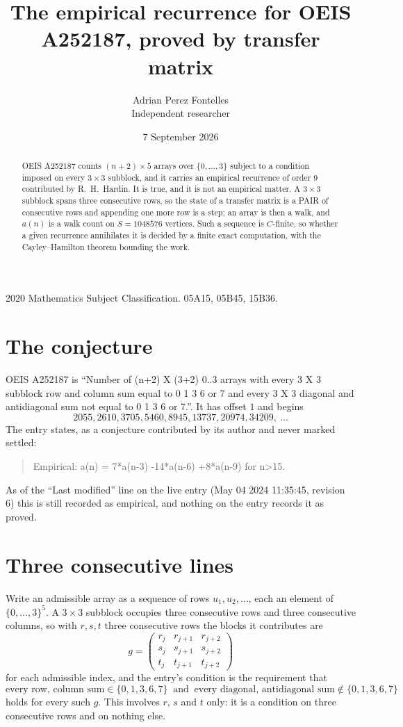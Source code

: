 \documentclass[11pt,a4paper]{article}
\title{The empirical recurrence for OEIS A252187, proved by transfer matrix}
\author{Adrian Perez Fontelles\\ \small Independent researcher}
\date{7 September 2026}
\theoremstyle{plain}
\theoremstyle{definition}
\begin{document}
\maketitle

\begin{abstract}
OEIS A252187 counts $(n+2)\times5$ arrays over $\{0,\dots,3\}$ subject to a condition imposed on
every $3\times3$ subblock, and it carries an empirical recurrence of order $9$
contributed by R.~H.~Hardin. It is true, and it is not an empirical matter. A $3\times3$
subblock spans three consecutive rows, so the state of a transfer matrix is a PAIR of
consecutive rows and appending one more row is a step; an array is then a walk, and
$a(n)$ is a walk count on $S=1048576$ vertices. Such a sequence is $C$-finite, so whether a given
recurrence annihilates it is decided by a finite exact computation, with the Cayley--Hamilton
theorem bounding the work.
\end{abstract}

\noindent\small 2020 Mathematics Subject Classification. 05A15, 05B45, 15B36.\normalsize

\section{The conjecture}

OEIS A252187 is ``Number of (n+2) X (3+2) 0..3 arrays with every 3 X 3 subblock row and column sum equal to 0 1 3 6 or 7 and every 3 X 3 diagonal and antidiagonal sum not equal to 0 1 3 6 or 7.''. It has offset $1$ and begins
\[
2055, 2610, 3705, 5460, 8945, 13737, 20974, 34209,\ \dots
\]
The entry states, as a conjecture contributed by its author and never marked settled:
\begin{quote}
Empirical: a(n) = 7*a(n-3) -14*a(n-6) +8*a(n-9) for n>15.
\end{quote}
As of the ``Last modified'' line on the live entry (May 04 2024 11:35:45, revision 6) this is still
recorded as empirical, and nothing on the entry records it as proved.

\section{Three consecutive lines}

Write an admissible array as a sequence of rows $u_1,u_2,\dots$, each an element of
$\{0,\dots,3\}^{5}$. A $3\times3$ subblock occupies three consecutive rows and
three consecutive columns, so with $r,s,t$ three consecutive rows the blocks it
contributes are
\[
g=\begin{pmatrix}r_j&r_{j+1}&r_{j+2}\\ s_j&s_{j+1}&s_{j+2}\\ t_j&t_{j+1}&t_{j+2}\end{pmatrix}
\]
for each admissible index, and the entry's condition is the requirement that
\[
\text{every row, column sum} \in \{0,1,3,6,7\}\ \text{ and }\ \text{every diagonal, antidiagonal sum} \notin \{0,1,3,6,7\}
\]
holds for every such $g$. This involves $r$, $s$ and $t$ only: it is a condition on
three consecutive rows and on nothing else.
\end{document}
